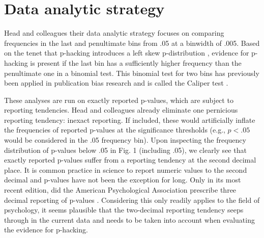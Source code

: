 \section{Data analytic strategy}
Head and colleagues their data analytic strategy focuses on comparing frequencies in the last and penultimate bins from .05 at a binwidth of .005. Based on the tenet that p-hacking introduces a left skew p-distribution \cite{Simonsohn2014}, evidence for p-hacking is present if the last bin has a sufficiently higher frequency than the penultimate one in a binomial test. This binomial test for two bins has previously been applied in publication bias research and is called the Caliper test \cite{gerber2010, kuhberger2014}.

These analyses are run on exactly reported p-values, which are subject to reporting tendencies. Head and colleagues already eliminate one pernicious reporting tendency: inexact reporting. If included, these would artificially inflate the frequencies of reported p-values at the significance thresholds (e.g., $p<.05$ would be considered in the .05 frequency bin). Upon inspecting the frequency distribution of p-values below .05 in Fig. 1 (including .05), we clearly see that exactly reported p-values suffer from a reporting tendency at the second decimal place. It is common practice in science to report numeric values to the second decimal and p-values have not been the exception for long. Only in its most recent edition, did the American Psychological Association prescribe three decimal reporting of p-values \cite{AmericanPsychologicalAssociation2010}. Considering this only readily applies to the field of psychology, it seems plausible that the two-decimal reporting tendency seeps through in the current data and needs to be taken into account when evaluating the evidence for p-hacking. 